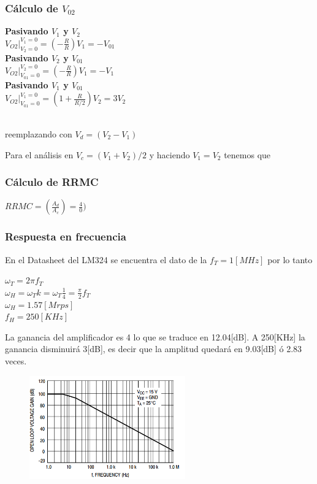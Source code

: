 \subsubsection{Cálculo de $V_{02}$}
\begin{flushleft}
\textbf{Pasivando $V_1$ y $V_2$}\\
$V_{O2}|^{V_1=0}_{V_2=0}=(-\frac{R}{R})V_1=-V_{01}$ \\
\textbf{Pasivando $V_2$ y $V_{01}$} \\
$V_{O2}|^{V_2=0}_{V_{01}=0}=(-\frac{R}{R})V_1=-V_1$ \\
\textbf{Pasivando $V_1$ y $V_{01}$} \\
$V_{O2}|^{V_1=0}_{V_{01}=0}=(1+\frac{R}{R/2})V_2=3V_2$ 
\end{flushleft}
\begin{center}
	\\
	reemplazando con $ V_d=(V_2-V_1)$ \\
\end{center}
\begin{flushleft}
	Para el análisis en $V_c=(V_1+V_2)/2$ y haciendo $V_1=V_2$ tenemos que \begin{center}
	\end{center}
\end{flushleft}
\subsubsection{Cálculo de RRMC}
\begin{center}
	$RRMC=(\frac{A_d}{A_c})=\frac{4}{0})$\\
\end{center}
\subsubsection{Respuesta en frecuencia}
En el Datasheet del LM324 se encuentra el dato de la $f_T=1[MHz]$ por lo tanto 
\begin{center}
	$\omega_T=2 \pi f_T$ \\
$\omega_H = \omega_T k = \omega_T \frac{1}{4} = \frac{\pi}{2} f_T $\\
$\omega_H = 1.57 [Mrps]$\\
$f_H = 250 [KHz]$
\end{center}
La ganancia del amplificador es 4 lo que se traduce en 12.04[dB]. A 250[KHz]  la ganancia disminuirá 3[dB], es decir que la amplitud quedará en 9.03[dB] ó 2.83 veces.
\begin{figure}[htb]
	\centering
			\includegraphics[width=0.6\textwidth]{figuras/graf_freq_lm324.png}
\end{figure}
